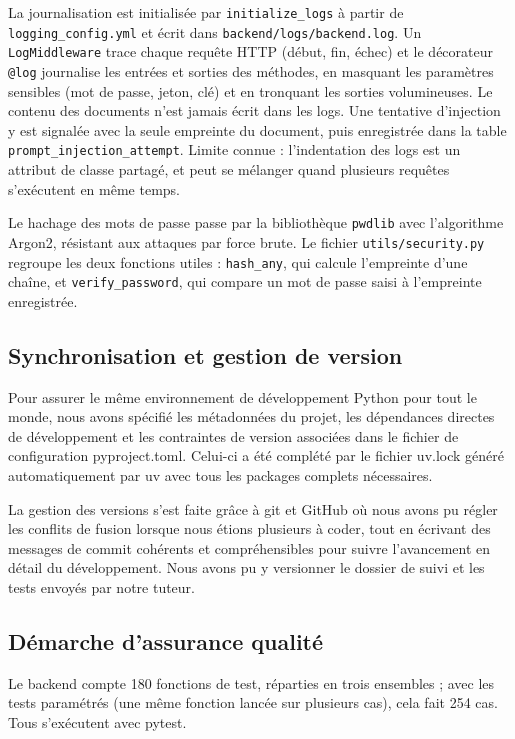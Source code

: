 \documentclass[12pt,a4paper]{article}
\begin{document}
La journalisation est initialisée par \texttt{initialize\_logs} à partir de \texttt{logging\_config.yml} et écrit dans \texttt{backend/logs/backend.log}. Un \texttt{LogMiddleware} trace chaque requête HTTP (début, fin, échec) et le décorateur \texttt{@log} journalise les entrées et sorties des méthodes, en masquant les paramètres sensibles (mot de passe, jeton, clé) et en tronquant les sorties volumineuses. Le contenu des documents n'est jamais écrit dans les logs. Une tentative d'injection y est signalée avec la seule empreinte du document, puis enregistrée dans la table \texttt{prompt\_injection\_attempt}. Limite connue : l'indentation des logs est un attribut de classe partagé, et peut se mélanger quand plusieurs requêtes s'exécutent en même temps.

Le hachage des mots de passe passe par la bibliothèque \texttt{pwdlib} avec l'algorithme Argon2, résistant aux attaques par force brute. Le fichier \texttt{utils/security.py} regroupe les deux fonctions utiles : \texttt{hash\_any}, qui calcule l'empreinte d'une chaîne, et \texttt{verify\_password}, qui compare un mot de passe saisi à l'empreinte enregistrée.

\subsection{Synchronisation et gestion de version}

Pour assurer le même environnement de développement Python pour tout le monde, nous avons spécifié les métadonnées du projet, les dépendances directes de développement et les contraintes de version associées dans le fichier de configuration pyproject.toml. Celui-ci a été complété par le fichier uv.lock généré automatiquement par uv avec tous les packages complets nécessaires.

La gestion des versions s'est faite grâce à git et GitHub où nous avons pu régler les conflits de fusion lorsque nous étions plusieurs à coder, tout en écrivant des messages de commit cohérents et compréhensibles pour suivre l'avancement en détail du développement. Nous avons pu y versionner le dossier de suivi et les tests envoyés par notre tuteur.

\subsection{Démarche d'assurance qualité}

Le backend compte 180 fonctions de test, réparties en trois ensembles ; avec les tests paramétrés (une même fonction lancée sur plusieurs cas), cela fait 254 cas. Tous s'exécutent avec pytest.
\end{document}
